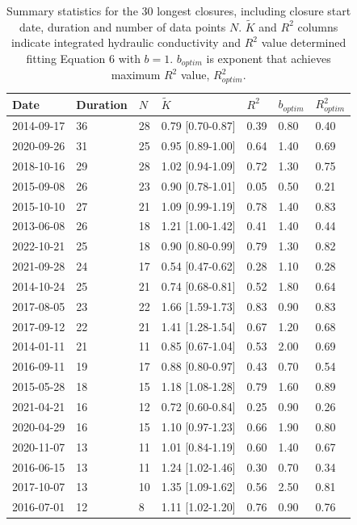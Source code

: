 \documentclass[preprint,12pt,authoryear]{elsarticle}
\begin{document}
\begin{table}[]    
    \centering
\caption{Summary statistics for the 30 longest closures, including closure start date, duration and number of data points $N$. $\tilde K$ and $R^2$ columns indicate integrated hydraulic conductivity and $R^2$ value determined fitting Equation 6 with $b = 1$.  $b_{optim}$ is exponent that achieves maximum $R^2$ value, $R^2_{optim}$. }   
    \small
\begin{tabular}{lllll|ll}
\hline
Date & Duration & $N$ & $\tilde K$ & $R^2$ & $b_{optim}$ & $R^2_{optim}$ \\
\hline
2014-09-17 & 36 & 28 & 0.79 [0.70-0.87] & 0.39 & 0.80 & 0.40 \\
2020-09-26 & 31 & 25 & 0.95 [0.89-1.00] & 0.64 & 1.40 & 0.69 \\
2018-10-16 & 29 & 28 & 1.02 [0.94-1.09] & 0.72 & 1.30 & 0.75 \\
2015-09-08 & 26 & 23 & 0.90 [0.78-1.01] & 0.05 & 0.50 & 0.21 \\
2015-10-10 & 27 & 21 & 1.09 [0.99-1.19] & 0.78 & 1.40 & 0.83 \\
2013-06-08 & 26 & 18 & 1.21 [1.00-1.42] & 0.41 & 1.40 & 0.44 \\
2022-10-21 & 25 & 18 & 0.90 [0.80-0.99] & 0.79 & 1.30 & 0.82 \\
2021-09-28 & 24 & 17 & 0.54 [0.47-0.62] & 0.28 & 1.10 & 0.28 \\
2014-10-24 & 25 & 21 & 0.74 [0.68-0.81] & 0.52 & 1.80 & 0.64 \\
2017-08-05 & 23 & 22 & 1.66 [1.59-1.73] & 0.83 & 0.90 & 0.83 \\
2017-09-12 & 22 & 21 & 1.41 [1.28-1.54] & 0.67 & 1.20 & 0.68 \\
2014-01-11 & 21 & 11 & 0.85 [0.67-1.04] & 0.53 & 2.00 & 0.69 \\
2016-09-11 & 19 & 17 & 0.88 [0.80-0.97] & 0.43 & 0.70 & 0.54 \\
2015-05-28 & 18 & 15 & 1.18 [1.08-1.28] & 0.79 & 1.60 & 0.89 \\
2021-04-21 & 16 & 12 & 0.72 [0.60-0.84] & 0.25 & 0.90 & 0.26 \\
2020-04-29 & 16 & 15 & 1.10 [0.97-1.23] & 0.66 & 1.90 & 0.80 \\
2020-11-07 & 13 & 11 & 1.01 [0.84-1.19] & 0.60 & 1.40 & 0.67 \\
2016-06-15 & 13 & 11 & 1.24 [1.02-1.46] & 0.30 & 0.70 & 0.34 \\
2017-10-07 & 13 & 10 & 1.35 [1.09-1.62] & 0.56 & 2.50 & 0.81 \\
2016-07-01 & 12 & 8 & 1.11 [1.02-1.20] & 0.76 & 0.90 & 0.76 \\

\end{tabular}
\end{table}
\end{document}
